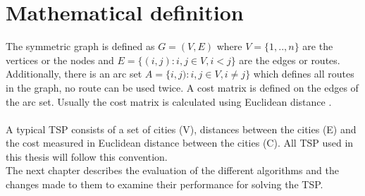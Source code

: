 \section{Mathematical definition}
The symmetric graph is defined as $G=(V,E)$ where $V=\{1,..,n\}$ are the vertices or the nodes and $E=\{(i,j):i,j\in V, i<j\}$ are the edges or routes. Additionally, there is an arc set $A=\{i,j):i,j\in V, i\neq j\}$ which defines all routes in the graph, no route can be used twice. A cost matrix is defined on the edges of the arc set. Usually the cost matrix is calculated using Euclidean distance \cite{Matai10}.\\\\
A typical TSP consists of a set of cities (V), distances between the cities (E) and the cost measured in Euclidean distance between the cities (C). All TSP used in this thesis will follow this convention.\\
 The next chapter describes the evaluation of the different algorithms and the changes made to them to examine their performance for solving the TSP.


 


